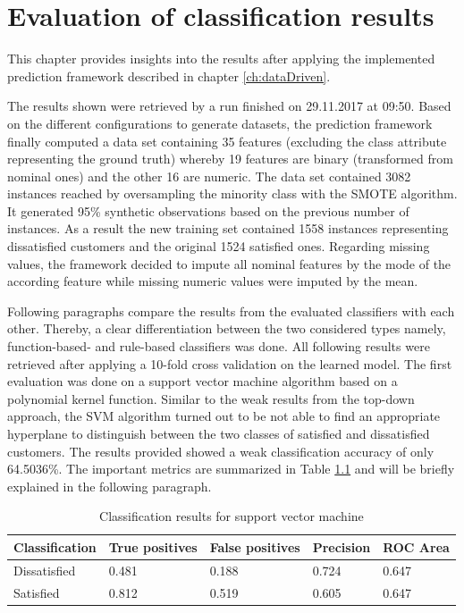 \chapter{Evaluation of classification results}
\label{ch:evaluation}

This chapter provides insights into the results after applying the implemented prediction framework described in chapter \ref{ch:dataDriven}. 

The results shown were retrieved by a run finished on 29.11.2017 at 09:50. Based on the different configurations to generate datasets, the prediction framework finally computed a data set containing 35 features (excluding the class attribute representing the ground truth) whereby 19 features are binary (transformed from nominal ones) and the other 16 are numeric. The data set contained 3082 instances reached by oversampling the minority class with the SMOTE algorithm. It generated 95\% synthetic observations based on the previous number of instances. As a result the new training set contained 1558 instances representing dissatisfied customers and the original 1524 satisfied ones. Regarding missing values, the framework decided to impute all nominal features by the mode of the according feature while missing numeric values were imputed by the mean.  	

Following paragraphs compare the results from the evaluated classifiers with each other. Thereby, a clear differentiation between the two considered types namely, function-based- and rule-based classifiers was done. All following results were retrieved after applying a 10-fold cross validation on the learned model. The first evaluation was done on a support vector machine algorithm based on a polynomial kernel function. Similar to the weak results from the top-down approach, the SVM algorithm turned out to be not able to find an appropriate hyperplane to distinguish between the two classes of satisfied and dissatisfied customers. The results provided showed a weak classification accuracy of only 64.5036\%. The important metrics are summarized in Table \ref{tab:svmResults} and will be briefly explained in the following paragraph. 

\begin{table}[]
	\centering
	\begin{tabular}{|l|l|l|l|l|}
		\hline
		\textbf{Classification} & \textbf{True positives} & \textbf{False positives} & \textbf{Precision} & \textbf{ROC Area} \\ \hline
		Dissatisfied            & 0.481                  & 0.188                    & 0.724              & 0.647             \\ \hline
		Satisfied               & 0.812                   & 0.519                    & 0.605                & 0.647             \\ \hline
	\end{tabular}
	\caption{Classification results for support vector machine}
	\label{tab:svmResults}
\end{table}

